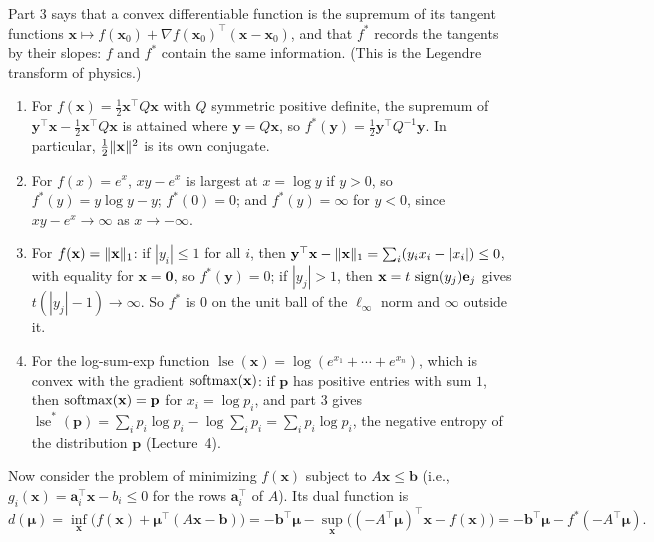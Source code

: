 Part 3 says that a convex differentiable function is the supremum of its tangent functions $\mathbf{x} \mapsto f(\mathbf{x}_0) + \nabla f(\mathbf{x}_0)^\top(\mathbf{x} - \mathbf{x}_0)$, and that $f^*$ records the tangents by their slopes: $f$ and $f^*$ contain the same information. (This is the Legendre transform of physics.)

\begin{example}\label{L3-ex:conjugates}
    \begin{enumerate}
        \item For $f(\mathbf{x}) = \frac{1}{2}\mathbf{x}^\top Q\mathbf{x}$ with $Q$ symmetric positive definite, the supremum of $\mathbf{y}^\top\mathbf{x} - \frac{1}{2}\mathbf{x}^\top Q\mathbf{x}$ is attained where $\mathbf{y} = Q\mathbf{x}$, so $f^*(\mathbf{y}) = \frac{1}{2}\mathbf{y}^\top Q^{-1}\mathbf{y}$. In particular, $\frac{1}{2}\lVert \mathbf{x} \rVert^2$ is its own conjugate.
        \item For $f(x) = e^x$, $xy - e^x$ is largest at $x = \log y$ if $y > 0$, so $f^*(y) = y\log y - y$; $f^*(0) = 0$; and $f^*(y) = \infty$ for $y < 0$, since $xy - e^x \to \infty$ as $x \to -\infty$.
        \item For $f(\mathbf{x}) = \lVert \mathbf{x} \rVert_1$: if $|y_i| \leq 1$ for all $i$, then $\mathbf{y}^\top\mathbf{x} - \lVert \mathbf{x} \rVert_1 = \sum_i (y_ix_i - |x_i|) \leq 0$, with equality for $\mathbf{x} = \mathbf{0}$, so $f^*(\mathbf{y}) = 0$; if $|y_j| > 1$, then $\mathbf{x} = t\,\operatorname{sign}(y_j)\mathbf{e}_j$ gives $t(|y_j| - 1) \to \infty$. So $f^*$ is $0$ on the unit ball of the $\ell_\infty$ norm and $\infty$ outside it.
        \item For the log-sum-exp function $\operatorname{lse}(\mathbf{x}) = \log(e^{x_1} + \cdots + e^{x_n})$, which is convex with the gradient $\operatorname{softmax}(\mathbf{x})$: if $\mathbf{p}$ has positive entries with sum $1$, then $\operatorname{softmax}(\mathbf{x}) = \mathbf{p}$ for $x_i = \log p_i$, and part 3 gives $\operatorname{lse}^*(\mathbf{p}) = \sum_i p_i\log p_i - \log\sum_i p_i = \sum_i p_i\log p_i$, the negative entropy of the distribution $\mathbf{p}$ (Lecture~4).
    \end{enumerate}
\end{example}

Now consider the problem of minimizing $f(\mathbf{x})$ subject to $A\mathbf{x} \leq \mathbf{b}$ (i.e., $g_i(\mathbf{x}) = \mathbf{a}_i^\top\mathbf{x} - b_i \leq 0$ for the rows $\mathbf{a}_i^\top$ of $A$). Its dual function is
\[d(\boldsymbol{\mu}) = \inf_{\mathbf{x}}\big(f(\mathbf{x}) + \boldsymbol{\mu}^\top(A\mathbf{x} - \mathbf{b})\big) = -\mathbf{b}^\top\boldsymbol{\mu} - \sup_{\mathbf{x}}\big((-A^\top\boldsymbol{\mu})^\top\mathbf{x} - f(\mathbf{x})\big) = -\mathbf{b}^\top\boldsymbol{\mu} - f^*(-A^\top\boldsymbol{\mu}).\]


